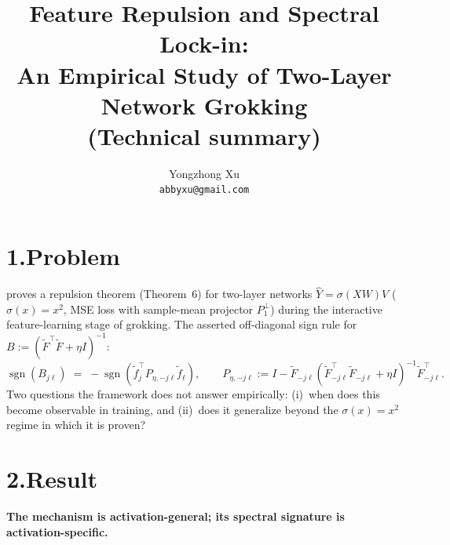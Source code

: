 \documentclass[11pt]{article}
\title{\vspace{-2.5em}Feature Repulsion and Spectral Lock-in:\\
An Empirical Study of Two-Layer Network Grokking\\
{\large \vspace{0.2em} (Technical summary)}}
\author{Yongzhong Xu\\
{\small \texttt{abbyxu@gmail.com}}}
\date{\vspace{-1em}}
\newcommand{\Ftil}{\widetilde{F}}
\newcommand{\sgn}{\operatorname{sgn}}
\begin{document}
\maketitle
\vspace{-2em}

\section*{1.\quad Problem}
\vspace{-0.4em}

\citet{tian2025li2} proves a repulsion theorem (Theorem~6) for two-layer
networks $\widehat Y = \sigma(XW)V$ ($\sigma(x){=}x^2$, MSE loss with sample-mean
projector $P_1^\perp$) during the interactive feature-learning stage of
grokking. The asserted off-diagonal sign rule for $B := (\Ftil^\top\Ftil + \eta I)^{-1}$:
\begin{equation}
\sgn(B_{j\ell}) \;=\; -\sgn\!\left(\widetilde f_j^\top P_{\eta,-j\ell}
\widetilde f_\ell\right),
\qquad
P_{\eta,-j\ell} := I - \Ftil_{-j\ell}(\Ftil_{-j\ell}^\top\Ftil_{-j\ell} +
\eta I)^{-1}\Ftil_{-j\ell}^\top.
\label{eq:thm6}
\end{equation}
Two questions the framework does not answer empirically: (i)~when does
this become observable in training, and (ii)~does it generalize beyond
the $\sigma(x){=}x^2$ regime in which it is proven?

\section*{2.\quad Result}
\vspace{-0.4em}

\textbf{The mechanism is activation-general; its spectral signature is
activation-specific.}
\end{document}
